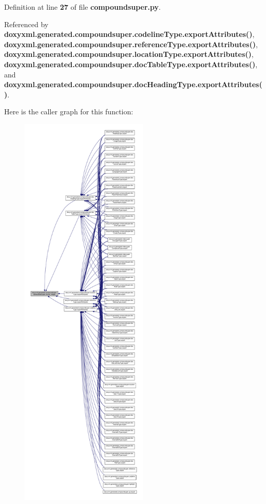 Definition at line {\bf 27} of file {\bf compoundsuper.\+py}.



Referenced by {\bf doxyxml.\+generated.\+compoundsuper.\+codeline\+Type.\+export\+Attributes()}, {\bf doxyxml.\+generated.\+compoundsuper.\+reference\+Type.\+export\+Attributes()}, {\bf doxyxml.\+generated.\+compoundsuper.\+location\+Type.\+export\+Attributes()}, {\bf doxyxml.\+generated.\+compoundsuper.\+doc\+Table\+Type.\+export\+Attributes()}, and {\bf doxyxml.\+generated.\+compoundsuper.\+doc\+Heading\+Type.\+export\+Attributes()}.



Here is the caller graph for this function\+:
\nopagebreak
\begin{figure}[H]
\begin{center}
\leavevmode
\includegraphics[height=550pt]{d8/d77/classdoxyxml_1_1generated_1_1compoundsuper_1_1GeneratedsSuper_a1d7ade1be42640444205919b52d87a96_icgraph}
\end{center}
\end{figure}


